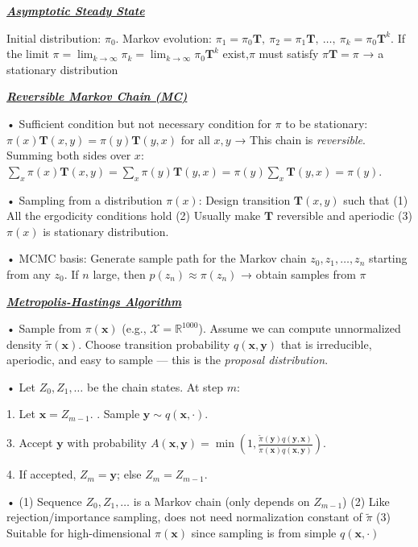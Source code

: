 \documentclass[10pt]{article}
\newcommand{\bulletPoint}[1]{\ul{\textit{\textbf{#1}}}}
\begin{document}
\begin{multicols*}{3}
\bulletPoint{Asymptotic Steady State}\quad

Initial distribution: $\pi_0$. 
Markov evolution: $\pi_1 = \pi_0 \mathbf{T}, \ \pi_2 = \pi_1 \mathbf{T}, \ \dots, \ \pi_k = \pi_0 \mathbf{T}^k$. 
If the limit $\pi = \lim_{k \to \infty} \pi_k = \lim_{k \to \infty} \pi_0 \mathbf{T}^k$ exist,$\pi$ must satisfy $\pi \mathbf{T} = \pi$ → a stationary distribution


\bulletPoint{Reversible Markov Chain (MC)}\quad

• Sufficient condition but not necessary condition for $\pi$ to be stationary: $\pi(x)\mathbf{T}(x,y) = \pi(y)\mathbf{T}(y,x)$ for all $x, y$  
→ This chain is \textit{reversible}. 
Summing both sides over $x$:  
$\sum_x \pi(x)\mathbf{T}(x,y) = \sum_x \pi(y)\mathbf{T}(y,x) = \pi(y)\sum_x \mathbf{T}(y,x) = \pi(y)$. 

• Sampling from a distribution $\pi(x)$: 
Design transition $\mathbf{T}(x,y)$ such that 
(1) All the ergodicity conditions hold  
(2) Usually make $\mathbf{T}$ reversible and aperiodic  
(3) $\pi(x)$ is stationary distribution. 

• MCMC basis:
Generate sample path for the Markov chain $z_0, z_1, \dots, z_n$ starting from any $z_0$.   
If $n$ large, then $p(z_n) \approx \pi(z_n)$  
→ obtain samples from $\pi$


\bulletPoint{Metropolis-Hastings Algorithm} \quad

• Sample from $\pi(\mathbf{x})$ (e.g., $\mathcal{X} = \mathbb{R}^{1000}$). 
Assume we can compute unnormalized density $\tilde{\pi}(\mathbf{x})$. 
Choose transition probability $q(\mathbf{x}, \mathbf{y})$ that is irreducible, aperiodic, and easy to sample — this is the \textit{proposal distribution}. 

• Let $Z_0, Z_1, \dots$ be the chain states. At step $m$:

1. Let $\mathbf{x} = Z_{m-1}$. . Sample $\mathbf{y} \sim q(\mathbf{x}, \cdot)$.   

3. Accept $\mathbf{y}$ with probability  
$A(\mathbf{x}, \mathbf{y}) = \min\left(1, \frac{\tilde{\pi}(\mathbf{y})q(\mathbf{y}, \mathbf{x})}{\tilde{\pi}(\mathbf{x})q(\mathbf{x}, \mathbf{y})} \right)$.   

4. If accepted, $Z_m = \mathbf{y}$; else $Z_m = Z_{m-1}$. 

• (1) Sequence $Z_0, Z_1, \dots$ is a Markov chain (only depends on $Z_{m-1}$)  
(2) Like rejection/importance sampling, does not need normalization constant of $\tilde{\pi}$  
(3) Suitable for high-dimensional $\pi(\mathbf{x})$ since sampling is from simple $q(\mathbf{x}, \cdot)$



\end{multicols*}
\end{document}
